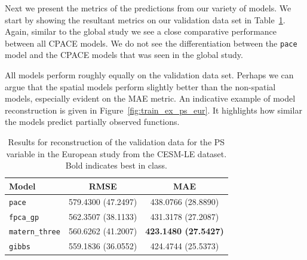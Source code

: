 Next we present the metrics of the predictions from our variety of models.
We start by showing the resultant metrics on our validation data set in Table~\ref{tab:train_cesm_ps_eur}.
Again, similar to the global study we see a close comparative performance between all CPACE models.
We do not see the differentiation between the \verb*|pace| model and the CPACE models that was seen in the global study.

All models perform roughly equally on the validation data set.
Perhaps we can argue that the spatial models perform slightly better than the non-spatial models, especially evident on the MAE metric.
An indicative example of model reconstruction is given in Figure~\ref{fig:train_ex_ps_eur}.
It highlights how similar the models predict partially observed functions. 

\begin{table}
	\caption[Results for the PS variable on validation data in the European study.]{Results for reconstruction of the validation data for the PS variable in the European study from the CESM-LE dataset. Bold indicates best in class.}
	\centering
	\label{tab:train_cesm_ps_eur}
	\begin{tabular}{lcc}
		\toprule
		\textbf{Model} & \textbf{RMSE} & \textbf{MAE} \\
		\midrule
		\verb*|pace| & 579.4300 (47.2497) & 438.0766 (28.8890) \\
		\verb*|fpca_gp| & 562.3507 (38.1133) & 431.3178 (27.2087) \\
		\verb*|matern_three| & 560.6262 (41.2007)& \textbf{423.1480 (27.5427)}\\
		\verb*|gibbs| & 559.1836 (36.0552) & 424.4744 (25.5373)\\
		\bottomrule
	\end{tabular}
\end{table}

